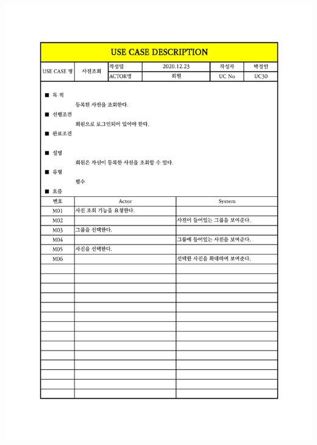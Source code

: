 {{{{{{{{{{{{{{{{{{{{{{{{{{{{{{{{\includegraphics[width=1.1\textwidth]{./Figure/Design/Display/usecase/030.pdf} \\
}}}}}}}}}}}}}}}}}}}}}}}}}}}}}}}}
